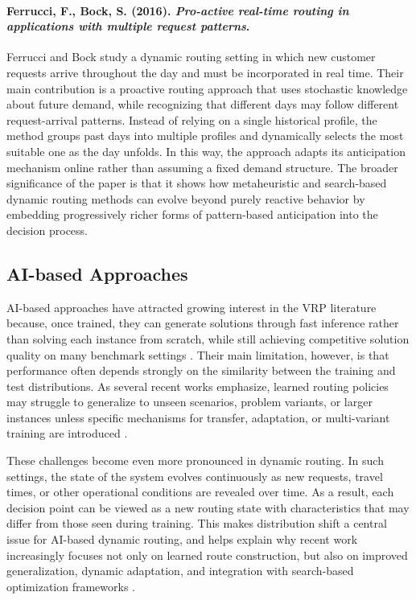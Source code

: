 \paragraph{Ferrucci, F., Bock, S. (2016). \textit{Pro-active real-time routing in applications with multiple request patterns}.}
Ferrucci and Bock \cite{ferrucciProactiveRealtimeRouting2016} study a dynamic routing setting in which new customer 
requests arrive throughout the day and must be incorporated in real time. Their main contribution is a proactive 
routing approach that uses stochastic knowledge about future demand, while recognizing that different days may follow
 different request-arrival patterns. Instead of relying on a single historical profile, the method groups past days 
 into multiple profiles and dynamically selects the most suitable one as the day unfolds. In this way, the approach 
 adapts its anticipation mechanism online rather than assuming a fixed demand structure. The broader significance of 
 the paper is that it shows how metaheuristic and search-based dynamic routing methods can evolve beyond purely 
 reactive behavior by embedding progressively richer forms of pattern-based anticipation into the decision process.
\subsection{AI-based Approaches}
AI-based approaches have attracted growing interest in the VRP literature because, once trained, they can generate 
solutions through fast inference rather than solving each instance from scratch, while still achieving competitive
solution quality on many benchmark settings \cite{nazariReinforcementLearningSolving2018,RouteFinder}.
Their main limitation, however, is that performance often depends strongly on the similarity between the training
and test distributions. As several recent works emphasize, learned routing policies may struggle to generalize to
unseen scenarios, problem variants, or larger instances unless specific mechanisms for transfer, adaptation, or 
multi-variant training are introduced \cite{chenReinforcementLearningApproach2026,RouteFinder,Hottung2025}. 

These challenges become even more pronounced in dynamic routing. In such settings, the state of the system evolves 
continuously as new requests, travel times, or other operational conditions are revealed over time. 
As a result, each decision point can be viewed as a new routing state with characteristics that may differ from those
seen during training. This makes distribution shift a central issue for AI-based dynamic routing, and helps explain 
why recent work increasingly focuses not only on learned route construction, but also on improved generalization, 
dynamic adaptation, and integration with search-based optimization frameworks 
\cite{chenReinforcementLearningApproach2026,sultanaFastApproximateSolutions,Hottung2020}.
